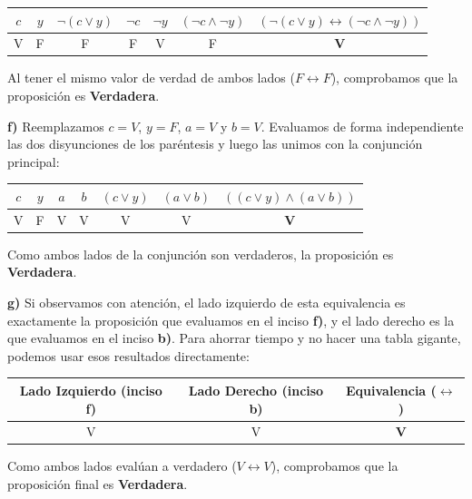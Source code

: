 \begin{center}
\begin{tabular}{|c|c|c|c|c|c|c|}
\hline
$c$ & $y$ & $\neg(c \vee y)$ & $\neg c$ & $\neg y$ & $(\neg c \wedge \neg y)$ & $(\neg(c \vee y) \leftrightarrow (\neg c \wedge \neg y))$ \\
\hline
V & F & F & F & V & F & \textbf{V} \\
\hline
\end{tabular}
\end{center}

Al tener el mismo valor de verdad de ambos lados ($F \leftrightarrow F$), comprobamos que la proposición es \textbf{Verdadera}.

\vspace{0.4cm}
\textbf{f)} Reemplazamos $c=V$, $y=F$, $a=V$ y $b=V$. Evaluamos de forma independiente las dos disyunciones de los paréntesis y luego las unimos con la conjunción principal:

\begin{center}
\begin{tabular}{|c|c|c|c|c|c|c|}
\hline
$c$ & $y$ & $a$ & $b$ & $(c \vee y)$ & $(a \vee b)$ & $((c \vee y) \wedge (a \vee b))$ \\
\hline
V & F & V & V & V & V & \textbf{V} \\
\hline
\end{tabular}
\end{center}

Como ambos lados de la conjunción son verdaderos, la proposición es \textbf{Verdadera}.

\vspace{0.4cm}
\textbf{g)} Si observamos con atención, el lado izquierdo de esta equivalencia es exactamente la proposición que evaluamos en el inciso \textbf{f)}, y el lado derecho es la que evaluamos en el inciso \textbf{b)}. Para ahorrar tiempo y no hacer una tabla gigante, podemos usar esos resultados directamente:

\begin{center}
\begin{tabular}{|c|c|c|} 
\hline
Lado Izquierdo (inciso f) & Lado Derecho (inciso b) & Equivalencia ($\leftrightarrow$) \\
\hline
V & V & \textbf{V} \\
\hline
\end{tabular}
\end{center}

Como ambos lados evalúan a verdadero ($V \leftrightarrow V$), comprobamos que la proposición final es \textbf{Verdadera}.

